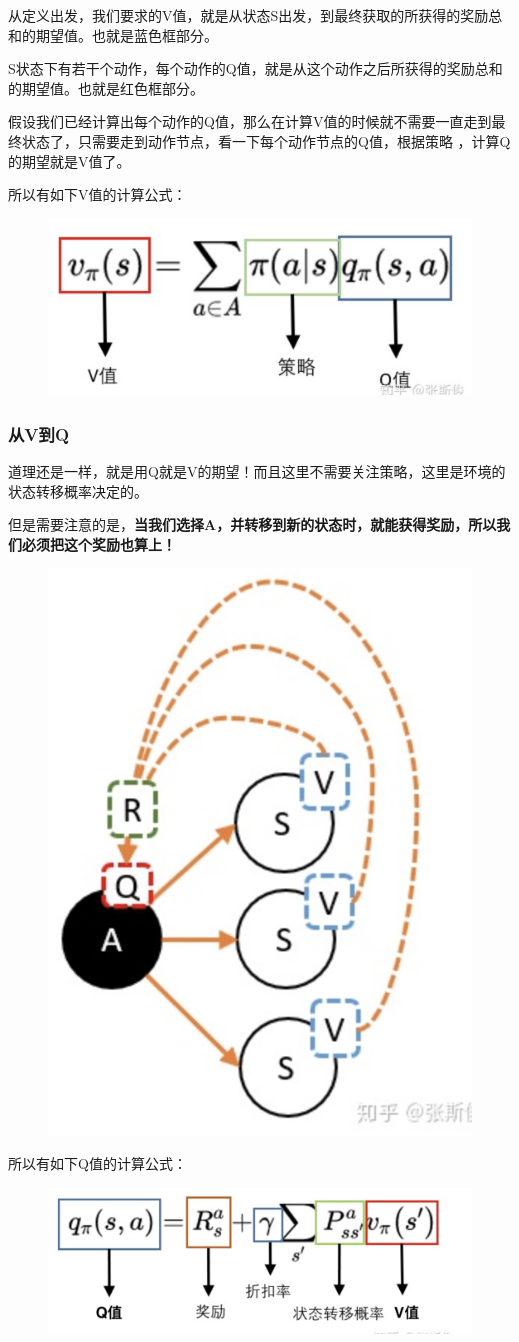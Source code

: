 \documentclass[12pt]{article}
\begin{document}
从定义出发，我们要求的V值，就是从状态S出发，到最终获取的所获得的奖励总和的期望值。也就是蓝色框部分。

S状态下有若干个动作，每个动作的Q值，就是从这个动作之后所获得的奖励总和的期望值。也就是红色框部分。

假设我们已经计算出每个动作的Q值，那么在计算V值的时候就不需要一直走到最终状态了，只需要走到动作节点，看一下每个动作节点的Q值，根据策略 ，计算Q的期望就是V值了。

所以有如下V值的计算公式：
\begin{figure}[H]
    \centering
    \includegraphics[width=.5\textwidth]{fig/ReinforcementLearning/RL_Compute_V_From_Q_Eq.png}
\end{figure}

\subsubsection{从V到Q}
道理还是一样，就是用Q就是V的期望！而且这里不需要关注策略，这里是环境的状态转移概率决定的。

但是需要注意的是，\textbf{当我们选择A，并转移到新的状态时，就能获得奖励，所以我们必须把这个奖励也算上！}
\begin{figure}[H]
    \centering
    \includegraphics[width=.3\textwidth]{fig/ReinforcementLearning/RL_Compute_Q_From_V.png}
\end{figure}

所以有如下Q值的计算公式：
\begin{figure}[H]
    \centering
    \includegraphics[width=.5\textwidth]{fig/ReinforcementLearning/RL_Compute_Q_From_V_Eq.png}
\end{figure}
\end{document}
